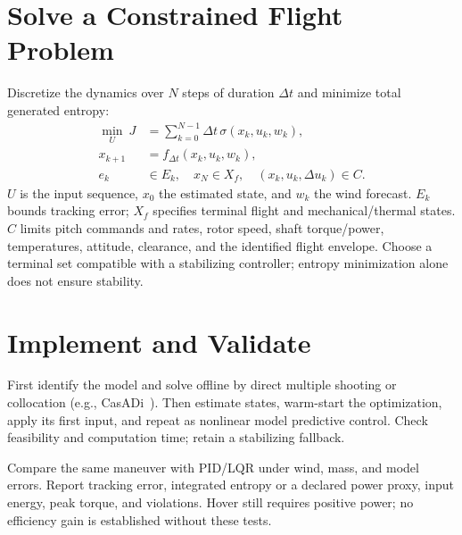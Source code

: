 \section{Solve a Constrained Flight Problem}
Discretize the dynamics over $N$ steps of duration $\Delta t$ and minimize
total generated entropy:
\begin{equation}
\begin{aligned}
\min_U\ J&=\sum_{k=0}^{N-1}\Delta t\,\sigma(x_k,u_k,w_k),\\
x_{k+1}&=f_{\Delta t}(x_k,u_k,w_k),\\
e_k&\in E_k,\quad x_N\in X_f,\quad(x_k,u_k,\Delta u_k)\in C.
\end{aligned}
\end{equation}
$U$ is the input sequence, $x_0$ the estimated state, and $w_k$ the wind
forecast. $E_k$ bounds tracking error; $X_f$ specifies terminal flight and
mechanical/thermal states. $C$ limits pitch commands and rates, rotor speed,
shaft torque/power, temperatures, attitude, clearance, and the identified
flight envelope. Choose a terminal set compatible with a stabilizing
controller; entropy minimization alone does not ensure stability.

\section{Implement and Validate}
First identify the model and solve offline by direct multiple shooting or
collocation (e.g., CasADi~\cite{casadi}). Then estimate states, warm-start the
optimization, apply its first input, and repeat as nonlinear model
predictive control. Check feasibility and computation time; retain a
stabilizing fallback.

Compare the same maneuver with PID/LQR under wind, mass, and model errors.
Report tracking error, integrated entropy or a declared power proxy, input
energy, peak torque, and violations. Hover still requires positive power;
no efficiency gain is established without these tests.

\begingroup
\raggedright


\endgroup

